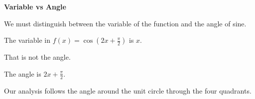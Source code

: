 \documentclass{ximera}
\begin{document}
\begin{warning} \textbf{\textcolor{red!70!black}{Variable vs Angle}}


We must distinguish between the variable of the function and the angle of sine.

The variable in $f(x) = \cos\left( 2 x + \frac{\pi}{2} \right)$ is $x$.

That is not the angle.

The angle is $2 x + \frac{\pi}{2}$.

Our analysis follows the angle around the unit circle through the four quadrants.

\end{warning}
\end{document}

